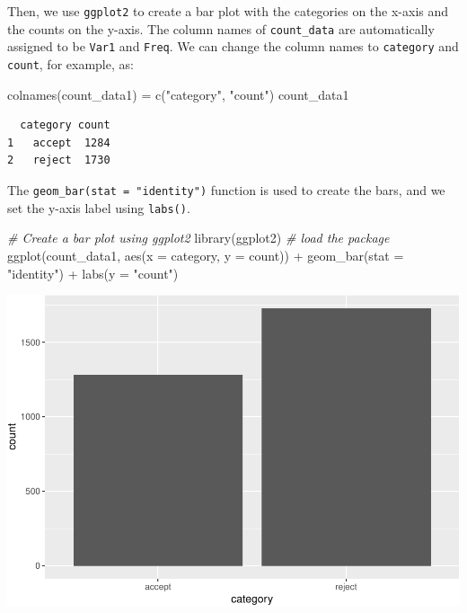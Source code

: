 \documentclass[
]{book}
\newenvironment{Shaded}{\begin{snugshade}}{\end{snugshade}}
\newcommand{\AttributeTok}[1]{\textcolor[rgb]{0.77,0.63,0.00}{#1}}
\newcommand{\CommentTok}[1]{\textcolor[rgb]{0.56,0.35,0.01}{\textit{#1}}}
\newcommand{\FunctionTok}[1]{\textcolor[rgb]{0.00,0.00,0.00}{#1}}
\newcommand{\NormalTok}[1]{#1}
\newcommand{\OtherTok}[1]{\textcolor[rgb]{0.56,0.35,0.01}{#1}}
\newcommand{\SpecialCharTok}[1]{\textcolor[rgb]{0.00,0.00,0.00}{#1}}
\newcommand{\StringTok}[1]{\textcolor[rgb]{0.31,0.60,0.02}{#1}}
\begin{document}
Then, we use \texttt{ggplot2} to create a bar plot with the categories on the x-axis and the counts on the y-axis. The column names of \texttt{count\_data} are automatically assigned to be \texttt{Var1} and \texttt{Freq}. We can change the column names to \texttt{category} and \texttt{count}, for example, as:

\begin{Shaded}
\begin{Highlighting}[]
\FunctionTok{colnames}\NormalTok{(count\_data1) }\OtherTok{=} \FunctionTok{c}\NormalTok{(}\StringTok{"category"}\NormalTok{, }\StringTok{"count"}\NormalTok{)}
\NormalTok{count\_data1}
\end{Highlighting}
\end{Shaded}

\begin{verbatim}
  category count
1   accept  1284
2   reject  1730
\end{verbatim}

The \texttt{geom\_bar(stat\ =\ "identity")} function is used to create the bars, and we set the y-axis label using \texttt{labs()}.

\begin{Shaded}
\begin{Highlighting}[]
\CommentTok{\# Create a bar plot using ggplot2}
\FunctionTok{library}\NormalTok{(ggplot2)  }\CommentTok{\# load the package}
\FunctionTok{ggplot}\NormalTok{(count\_data1, }\FunctionTok{aes}\NormalTok{(}\AttributeTok{x =}\NormalTok{ category, }\AttributeTok{y =}\NormalTok{ count)) }\SpecialCharTok{+}
  \FunctionTok{geom\_bar}\NormalTok{(}\AttributeTok{stat =} \StringTok{"identity"}\NormalTok{) }\SpecialCharTok{+}
  \FunctionTok{labs}\NormalTok{(}\AttributeTok{y =} \StringTok{"count"}\NormalTok{)}
\end{Highlighting}
\end{Shaded}

\includegraphics[width=1\linewidth]{Class_Activity_4_files/figure-latex/unnamed-chunk-27-1}
\end{document}
